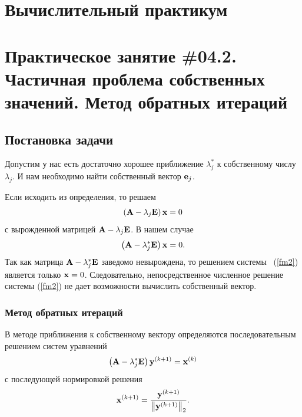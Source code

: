 \documentclass[12pt]{article}
\begin{document}
	\begin{flushright}
	\end{flushright}
	\begin{flushright}
	\end{flushright}
    \section*{Вычислительный практикум}
    \section*{Практическое занятие \#04.2. Частичная проблема собственных значений. Метод обратных итераций}

	\subsection*{Постановка задачи}
	
	Допустим у нас есть достаточно хорошее приближение $\lambda_j^{*}$ к собственному числу $\lambda_j$. И нам необходимо найти собственный вектор $\bold{e}_j$.
	
	Если исходить из определения, то решаем
	\begin{equation}
		\left(\bold{A}-\lambda_j\bold{E}\right)\bold{x}=0
	\end{equation}
	с вырожденной матрицей $\bold{A}-\lambda_j\bold{E}$. В нашем случае
	\begin{equation}
		\left(\bold{A}-\lambda_j^{*}\bold{E}\right)\bold{x}=0.\label{fm2}
	\end{equation}
	Так как матрица $\bold{A}-\lambda_j^{*}\bold{E}$ заведомо невырождена, то решением системы~ (\ref{fm2}) является только $\bold{x}=0$. Следовательно, непосредственное численное решение системы (\ref{fm2}) не дает возможности вычислить собственный вектор.
	
	\subsubsection*{Метод обратных итераций}
	
	В методе приближения к собственному вектору определяются последовательным решением систем уравнений
	\begin{equation}
		\left(\bold{A}-\lambda_j^{*}\bold{E}\right)\bold{y}^{\left(k+1\right)}=\bold{x}^{\left(k\right)}\label{fm6}
	\end{equation}
	с последующей нормировкой решения
	\begin{equation}
		\bold{x}^{\left(k+1\right)}=\frac{\bold{y}^{\left(k+1\right)}}{\left\|\bold{y}^{\left(k+1\right)}\right\|_2}.
	\end{equation}
	
\end{document}
